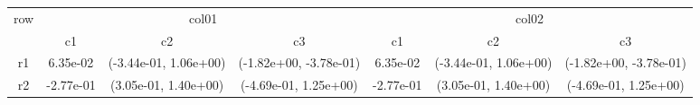 \begin{tabular}{ccccccc}
\toprule
\multirow{2}{*}{row}&\multicolumn{3}{c}{col01}&\multicolumn{3}{c}{col02}\tabularnewline
\cmidrule(lr){2-4}
\cmidrule(lr){5-7}
&c1&c2&c3&c1&c2&c3\tabularnewline
\midrule
r1&6.35e-02& (-3.44e-01, 1.06e+00)& (-1.82e+00, -3.78e-01)&6.35e-02& (-3.44e-01, 1.06e+00)& (-1.82e+00, -3.78e-01)\tabularnewline
r2&-2.77e-01& (3.05e-01, 1.40e+00)& (-4.69e-01, 1.25e+00)&-2.77e-01& (3.05e-01, 1.40e+00)& (-4.69e-01, 1.25e+00)\tabularnewline
\bottomrule
\end{tabular}
